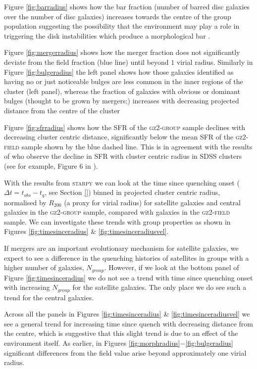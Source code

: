\documentclass[useAMS,usenatbib]{mn2e}
\def\starpy ~{\textsc{starpy}}
\begin{document}
Figure \ref{fig:barradius} shows how the bar fraction (number of barred disc galaxies over the number of disc galaxies) increases towards the centre of the group population suggesting the possibility that the environment may play a role in triggering the disk instabilities which produce a morphological bar \citep{ref, ref, ref}. 

Figure \ref{fig:mergerradius} shows how the merger fraction does not significantly deviate from the field fraction (blue line) until beyond $1$ virial radius. Similarly in Figure \ref{fig:bulgeradius} the left panel shows how those galaxies identified as having no or just noticeable bulges are less common in the inner regions of the cluster (left panel), whereas the fraction of galaxies with obvious or dominant bulges (thought to be grown by mergers;\citealt{ref, ref, ref}) increases with decreasing projected distance from the centre of the cluster 

Figure \ref{fig:sfrradius} shows how the SFR of the \textsc{gz2-group} sample declines with decreasing cluster centric distance, significantly below the mean SFR of the \textsc{gz2-field} sample shown by the blue dashed line. This is in agreement with the results of \cite{gomez03} who observe the decline in SFR with cluster centric radius in SDSS clusters (see for example, Figure 6 in \citealt{gomez03}). 

With the results from \starpy~ we can look at the time since quenching onset ($\Delta t = t_{obs} - t_{q}$, see Section \ref{}) binned in projected cluster centric radius, normalised by $R_{200}$ (a proxy for virial radius) for satellite galaxies and central galaxies in the \textsc{gz2-group} sample, compared with galaxies in the \textsc{gz2-field} sample. We can investigate these trends with group properties as shown in Figures \ref{fig:timesinceradius} \& \ref{fig:timesinceradiusvel}. 

If mergers are an important evolutionary mechanism for satellite galaxies, we expect to see a difference in the quenching histories of satellites in groups with a higher number of galaxies, $N_{group}$. However, if we look at the bottom panel of Figure \ref{fig:timesinceradius} we do not see a trend with time since quenching onset with increasing $N_{group}$ for the satellite galaxies. The only place we do see such a trend for the central galaxies. 

Across all the panels in Figures \ref{fig:timesinceradius} \& \ref{fig:timesinceradiusvel} we see a general trend for increasing time since quench with decreasing distance from the centre, which is suggestive that this slight trend is due to an effect of the environment itself. As earlier, in Figures \ref{fig:morphradius}$-$\ref{fig:bulgeradius} significant differences from the field value arise beyond approximately one virial radius. 
\end{document}
